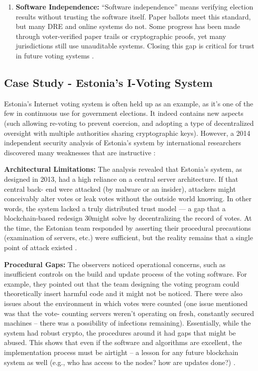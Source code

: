 \documentclass[a4paper,10pt]{report}
\begin{document}
\begin{enumerate}
    \item \textbf{Software Independence:} “Software independence” means verifying election results without trusting the software itself. Paper ballots meet this standard, but many DRE and online systems do not. Some progress has been made through voter-verified paper trails or cryptographic proofs, yet many jurisdictions still use unauditable systems. Closing this gap is critical for trust in future voting systems \cite{brookings_paper_voting, pmc_ncbi}.
\end{enumerate}

\subsection{Case Study - Estonia’s I-Voting System}

Estonia’s Internet voting system is often held up as an example, as it’s one of the few in continuous use for government elections.  It indeed contains new aspects (such allowing re-voting to prevent coercion, and adopting a type of decentralized oversight with multiple authorities sharing cryptographic keys).  However, a 2014 independent security analysis of Estonia’s system by international researchers discovered many weaknesses that are instructive \cite{jhalderm_website}:

  \textbf  {Architectural Limitations:}   The analysis revealed that Estonia’s system, as designed in 2013, had a high reliance on a central server architecture.  If that central back- end were attacked (by malware or an insider), attackers might conceivably alter votes or leak votes without the outside world knowing.  In other words, the system lacked a truly distributed trust model — a gap that a blockchain-based redesign 30might solve by decentralizing the record of votes.  At the time, the Estonian team responded by asserting their procedural precautions (examination of servers, etc.) were sufficient, but the reality remains that a single point of attack existed \cite{jhalderm_website}.

  \textbf  {Procedural Gaps:}   The observers noticed operational concerns, such as insufficient controls on the build and update process of the voting software.  For example, they pointed out that the team designing the voting program could theoretically insert harmful code and it might not be noticed.  There were also issues about the environment in which votes were counted (one issue mentioned was that the vote- counting servers weren’t operating on fresh, constantly secured machines – there was a possibility of infections remaining).  Essentially, while the system had robust crypto, the procedures around it had gaps that might be abused.  This shows that even if the software and algorithms are excellent, the implementation process must be airtight – a lesson for any future blockchain system as well (e.g., who has access to the nodes?  how are updates done?)  \cite{jhalderm_website}.
\end{document}
